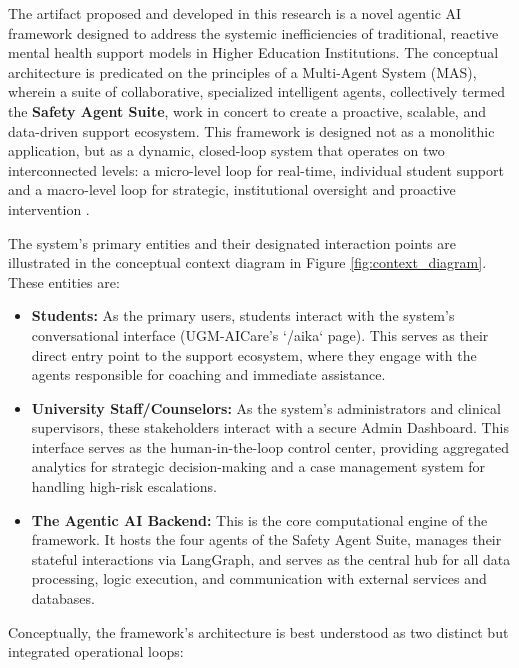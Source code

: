 The artifact proposed and developed in this research is a novel agentic AI framework designed to address the systemic inefficiencies of traditional, reactive mental health support models in Higher Education Institutions. The conceptual architecture is predicated on the principles of a Multi-Agent System (MAS), wherein a suite of collaborative, specialized intelligent agents, collectively termed the \textbf{Safety Agent Suite}, work in concert to create a proactive, scalable, and data-driven support ecosystem. This framework is designed not as a monolithic application, but as a dynamic, closed-loop system that operates on two interconnected levels: a micro-level loop for real-time, individual student support and a macro-level loop for strategic, institutional oversight and proactive intervention \cite{kashiv2025aidrivennetworks, nwoke2025insightautomation}.

The system's primary entities and their designated interaction points are illustrated in the conceptual context diagram in Figure \ref{fig:context_diagram}. These entities are:
\begin{itemize}
    \item \textbf{Students:} As the primary users, students interact with the system's conversational interface (UGM-AICare's `/aika` page). This serves as their direct entry point to the support ecosystem, where they engage with the agents responsible for coaching and immediate assistance.
    \item \textbf{University Staff/Counselors:} As the system's administrators and clinical supervisors, these stakeholders interact with a secure Admin Dashboard. This interface serves as the human-in-the-loop control center, providing aggregated analytics for strategic decision-making and a case management system for handling high-risk escalations.
    \item \textbf{The Agentic AI Backend:} This is the core computational engine of the framework. It hosts the four agents of the Safety Agent Suite, manages their stateful interactions via LangGraph, and serves as the central hub for all data processing, logic execution, and communication with external services and databases.
\end{itemize}

Conceptually, the framework's architecture is best understood as two distinct but integrated operational loops:

